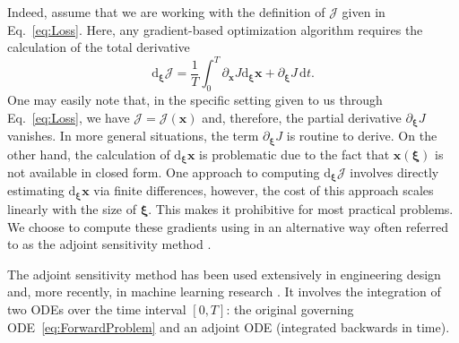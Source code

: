 \documentclass[ reprint,
nofootinbib,
 amsmath,amssymb,
 aps,
]{revtex4-2}
\begin{document}
Indeed, assume that we are working with the definition of $\mathcal{J}$ given in Eq.~\cref{eq:Loss}.
Here, any gradient-based optimization algorithm requires the calculation of the total derivative
\begin{equation}
	\mathrm{d}_{\bm{\xi}} \mathcal{J}
	=
	\frac{1}{T}
	\int_{0}^{T}
	\partial_{\mathbf{x}} J \mathrm{d}_{\bm{\xi}} \mathbf{x}
		+
	\partial_{\bm{\xi}} J
		\,
	\mathrm{d}t
	.
\end{equation}
One may easily note that, in the specific setting given to us through Eq.~\cref{eq:Loss}, we have $\mathcal{J} = \mathcal{J}(\mathbf{x})$ and, therefore, the partial derivative $\partial_{\bm{\xi}} J$ vanishes.
In more general situations, the term $\partial_{\bm{\xi}} J$ is routine to derive.
On the other hand, the calculation of $\mathrm{d}_{\bm{\xi}} \mathbf{x}$ is problematic due to the fact that $\mathbf{x}(\bm{\xi})$ is not available in closed form.
One approach to computing $\mathrm{d}_{\bm{\xi}} \mathcal{J}$ involves directly estimating $\mathrm{d}_{\bm{\xi}} \mathbf{x}$ via finite differences, however, the cost of this approach scales linearly with the size of $\bm{\xi}$.
This makes it prohibitive for most practical problems.
We choose to compute these gradients using in an alternative way often referred to as the adjoint sensitivity method \cite{boltyanskiy1962mathematical}.


The adjoint sensitivity method has been used extensively in engineering design \cite{jameson1988aerodynamic,giles2000introduction} and, more recently, in machine learning research \cite{chen2018neural,rackauckas2020universal,belbute2020combining}.
It involves the integration of two ODEs over the time interval $[0,T]$: the original governing ODE~\cref{eq:ForwardProblem} and an adjoint ODE (integrated backwards in time).
\end{document}

